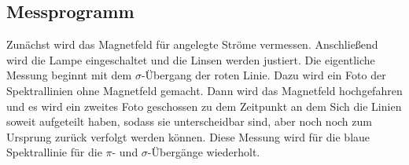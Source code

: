 \subsection{Messprogramm}
Zunächst wird das Magnetfeld für angelegte Ströme vermessen.
Anschließend wird die Lampe eingeschaltet und die Linsen werden justiert.
Die eigentliche Messung beginnt mit dem $\sigma$-Übergang der roten Linie.
Dazu wird ein Foto der Spektrallinien ohne Magnetfeld gemacht.
Dann wird das Magnetfeld hochgefahren und es wird ein zweites Foto geschossen zu dem Zeitpunkt an dem Sich die Linien soweit aufgeteilt haben, sodass sie unterscheidbar sind, aber noch noch zum Ursprung zurück verfolgt werden können.
Diese Messung wird für die blaue Spektrallinie für die $\pi$- und $\sigma$-Übergänge wiederholt.